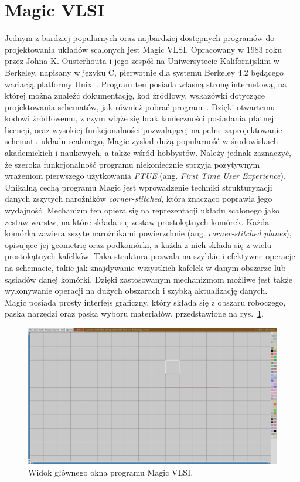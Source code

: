 \section{Magic VLSI}

Jednym z bardziej popularnych oraz najbardziej dostępnych programów do projektowania układów scalonych
jest Magic VLSI\@.
Opracowany w 1983 roku przez Johna K. Ousterhouta i jego zespół na Uniwersytecie Kalifornijskim w Berkeley,
napisany w języku C, pierwotnie dla systemu Berkeley 4.2 będącego wariacją platformy Unix~\cite{MAGIC_article}.
Program ten posiada własną stronę internetową, na której można znaleźć dokumentację, kod źródłowy,
wskazówki dotyczące projektowania schematów, jak również pobrać program~\cite{MAGIC_site}.
Dzięki otwartemu kodowi źródłowemu, z czym wiąże się brak konieczności posiadania płatnej licencji,
oraz wysokiej funkcjonalności pozwalającej na pełne zaprojektowanie schematu układu scalonego,
Magic zyskał dużą popularność
w środowiskach akademickich i naukowych, a także wśród hobbystów.
Należy jednak zaznaczyć, że szeroka funkcjonalność programu
niekoniecznie sprzyja pozytywnym wrażeniom pierwszego użytkowania \textit{FTUE}
(ang. \textit{First Time User Experience}).
\newpage
\indent Unikalną cechą programu Magic jest wprowadzenie techniki strukturyzacji danych
zszytych narożników \textit{corner-stitched},
która znacząco poprawia jego wydajność.
Mechanizm ten opiera się na reprezentacji układu scalonego jako zestaw warstw,
na które składa się zestaw prostokątnych komórek.
Każda komórka zawiera zszyte narożnikami powierzchnie (ang. \textit{corner-stitched planes}),
opisujące jej geometrię oraz podkomórki, a każda z nich składa się z wielu prostokątnych kafelków.
Taka struktura pozwala na szybkie i efektywne operacje na schemacie,
takie jak znajdywanie wszystkich kafelek w danym obszarze lub sąsiadów danej komórki.
Dzięki zastosowanym mechanizmom możliwe jest także wykonywanie operacji na dużych obszarach
i szybką aktualizację danych.\\
\indent Magic posiada prosty interfejs graficzny,
który składa się z obszaru roboczego, paska narzędzi oraz paska wyboru materiałów,
przedstawione na rys.~\ref{fig:magic_okno}.

\begin{figure}[h]
    \centering
    \includegraphics[width=.8\textwidth]{chapters/chapter2/img/magic_okno}
    \caption{Widok głównego okna programu Magic VLSI.}
    \label{fig:magic_okno}
\end{figure}

